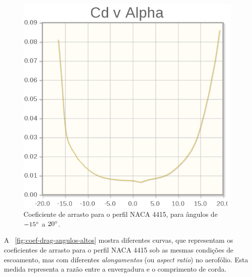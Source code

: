 \documentclass{article}
\let\oldforeignlanguage\foreignlanguage
\renewcommand\foreignlanguage[2]{\oldforeignlanguage{#1}{\emph{#2}}}
\begin{document}
	\begin{figure}[ht]
		\centering
		\includegraphics[scale=0.3]{coef-drag-angulos-baixos.png}
		\caption{Coeficiente de arrasto para o perfil NACA 4415, para ângulos de $-15\degree$ a $20\degree$.}
		\label{fig:coef-drag-angulos-baixos}
	\end{figure}

	A \figurename\ \ref{fig:coef-drag-angulos-altos} mostra diferentes curvas, que representam os coeficientes de arrasto para o perfil NACA 4415
	sob as mesmas condições de escoamento, mas com diferentes \emph{alongamentos} (ou \foreignlanguage{english}{aspect ratio}) no aerofólio.
	Esta medida representa a razão entre a envergadura e o comprimento de corda.
\end{document}
